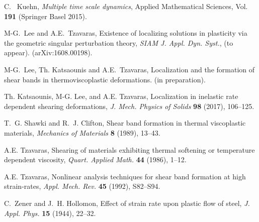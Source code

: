 \documentclass[graybox]{svmult}
\begin{document}
\begin{thebibliography}{10}
{\sc C.~ Kuehn}, 
{\it Multiple time scale dynamics}, Applied Mathematical Sciences, Vol. {\bf 191} (Springer Basel 2015).
  
{\sc M-G.~Lee and A.E.~Tzavaras},
Existence of localizing solutions in plasticity via the geometric singular perturbation theory, 
{\em SIAM J. Appl. Dyn. Syst.}, (to appear). (arXiv:1608.00198).

{\sc M-G.~Lee, Th. Katsaounis and A.E.~Tzavaras},
Localization and the formation of shear bands in thermoviscoplastic deformations. (in preparation).

{\sc Th. Katsaounis, M-G. Lee, and A.E. Tzavaras}, 
Localization in inelastic rate dependent shearing deformations, 
{\em J.  Mech. Physics of Solids} {\bf 98} (2017), 106--125.


{\sc T.~G. Shawki and R.~J. Clifton}, 
Shear band formation in thermal viscoplastic materials, 
{\em Mechanics of Materials} {\bf 8 } (1989), 13--43.

{\sc A.E. Tzavaras},
Shearing of materials exhibiting thermal softening or temperature dependent viscosity,
{\em Quart.  Applied Math.} {\bf 44} (1986), 1--12.


{\sc A.E. Tzavaras}, 
Nonlinear analysis techniques for shear band formation at high strain-rates, 
{\it Appl. Mech. Rev.}
{\bf  45} (1992), S82--S94.


{\sc C.~Zener and J.~H. Hollomon}, 
Effect of strain rate upon plastic flow of steel,
{\it J. Appl. Phys.}
{\bf 15} (1944), 22--32.
\end{thebibliography}
\end{document}
